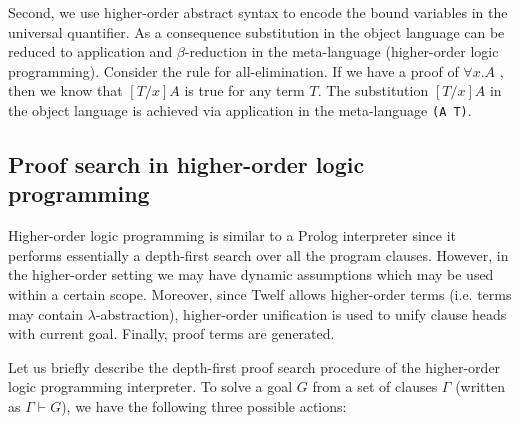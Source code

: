 \documentclass{acmconf}
\newcommand{\vd}{\vdash}
\begin{document}
Second, we use higher-order abstract syntax to encode the bound
variables in the universal quantifier. As a consequence substitution
in the object language can be reduced to application and
$\beta$-reduction in the meta-language (higher-order logic
programming). Consider the rule for all-elimination. If we have a proof of
$\forall x.A$ , then we know that $[T/x]A$ is true for any term
$T$. The substitution $[T/x]A$ in the object language is achieved via
application in the meta-language {\tt (A T)}. 



\subsection{Proof search in higher-order logic programming}

Higher-order logic programming is similar to a Prolog interpreter
since it performs essentially a depth-first search over all the
program clauses. However, in the higher-order setting we may have
dynamic assumptions which may be used within a certain
scope. Moreover, since Twelf allows higher-order terms (i.e. terms may
contain $\lambda$-abstraction), higher-order unification is used to
unify clause heads with current goal. Finally, proof terms are
generated.

Let us briefly describe the depth-first proof search procedure of
the higher-order logic programming interpreter. 
To solve a goal $G$ from a set of clauses $\Gamma$ (written as $\Gamma
\vd G$), we have the following three possible actions:  
\end{document}

